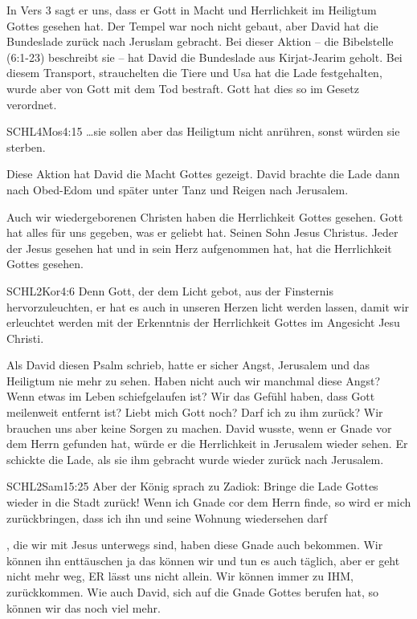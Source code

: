 \documentclass[14pt]{../../inc/mybib}
\begin{document}
    \begin{block}
        In Vers 3 sagt er uns, dass er Gott in Macht und Herrlichkeit im Heiligtum Gottes gesehen hat. Der Tempel war noch nicht gebaut, aber David hat die Bundeslade zurück nach Jeruslam gebracht. Bei dieser Aktion -- die Bibelstelle (6:1-23) beschreibt sie -- hat David die Bundeslade aus Kirjat-Jearim geholt. Bei diesem Transport, strauchelten die Tiere und Usa hat die Lade festgehalten, wurde aber von Gott mit dem Tod bestraft. Gott hat dies so im Gesetz verordnet. 
        \begin{bibelbox}{SCHL}{4Mos}{4:15}
            \dots sie sollen aber das Heiligtum nicht anrühren, sonst würden sie sterben.
        \end{bibelbox}
        Diese Aktion hat David die Macht Gottes gezeigt. David brachte die Lade dann nach Obed-Edom und später unter Tanz und Reigen nach Jerusalem.
    \end{block}
    \begin{block}
        Auch wir wiedergeborenen Christen haben die Herrlichkeit Gottes gesehen. Gott hat alles für uns gegeben, was er geliebt hat. Seinen Sohn Jesus Christus. Jeder der Jesus gesehen hat und in sein Herz aufgenommen hat, hat die Herrlichkeit Gottes gesehen.
        \begin{bibelbox}{SCHL}{2Kor}{4:6}
            Denn Gott, der dem Licht gebot, aus der Finsternis hervorzuleuchten, er hat es auch in unseren Herzen licht werden lassen, damit wir erleuchtet werden mit der Erkenntnis der Herrlichkeit Gottes im Angesicht Jesu Christi.
        \end{bibelbox}
    \end{block}

    \begin{block}
        Als David diesen Psalm schrieb, hatte er sicher Angst, Jerusalem und das Heiligtum nie mehr zu sehen. Haben nicht auch wir manchmal diese Angst? Wenn etwas im Leben schiefgelaufen ist? Wir das Gefühl haben, dass Gott meilenweit entfernt ist? Liebt mich Gott noch? Darf ich zu ihm zurück? Wir brauchen uns aber keine Sorgen zu machen. David wusste, wenn er Gnade vor dem Herrn gefunden hat, würde er die Herrlichkeit in Jerusalem wieder sehen. Er schickte die Lade, als sie ihm gebracht wurde wieder zurück nach Jerusalem.
        \begin{bibelbox}{SCHL}{2Sam}{15:25}
            Aber der König sprach zu Zadiok: Bringe die Lade Gottes wieder in die Stadt zurück! Wenn ich Gnade cor dem Herrn finde, so wird er mich zurückbringen, dass ich ihn und seine Wohnung wiedersehen darf
        \end{bibelbox}
        , die wir mit Jesus unterwegs sind, haben diese Gnade auch bekommen. Wir können ihn enttäuschen ja das können wir und tun es auch täglich, aber er geht nicht mehr weg, ER lässt uns nicht allein. Wir können immer zu IHM,  zurückkommen. Wie auch David, sich auf die Gnade Gottes berufen hat, so können wir das noch viel mehr.
    \end{block}
\end{document}
